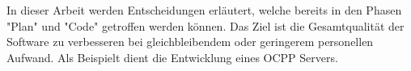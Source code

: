 
In dieser Arbeit werden Entscheidungen erläutert, 
welche bereits in den Phasen "Plan" und "Code" getroffen werden können.
Das Ziel ist die Gesamtqualität der Software zu verbesseren bei 
gleichbleibendem oder geringerem personellen Aufwand. Als Beispielt dient die Entwicklung eines OCPP Servers.